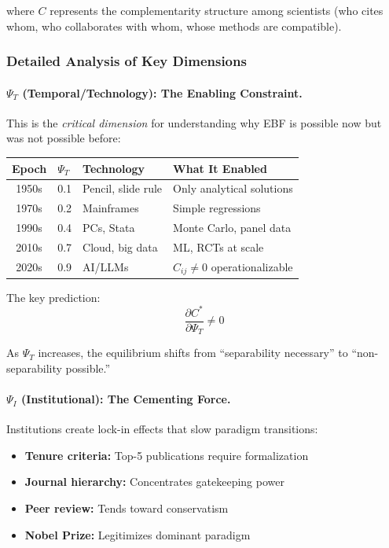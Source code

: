 where $C$ represents the complementarity structure among scientists (who cites whom,
who collaborates with whom, whose methods are compatible).

\subsubsection{Detailed Analysis of Key Dimensions}

\paragraph{$\Psi_T$ (Temporal/Technology): The Enabling Constraint.}

This is the \textit{critical dimension} for understanding why EBF is possible now
but was not possible before:

\begin{center}
\renewcommand{\arraystretch}{1.3}
\small
\begin{tabular}{@{}clll@{}}
\toprule
\textbf{Epoch} & $\Psi_T$ & \textbf{Technology} & \textbf{What It Enabled} \\
\midrule
1950s & 0.1 & Pencil, slide rule & Only analytical solutions \\
1970s & 0.2 & Mainframes & Simple regressions \\
1990s & 0.4 & PCs, Stata & Monte Carlo, panel data \\
2010s & 0.7 & Cloud, big data & ML, RCTs at scale \\
2020s & 0.9 & AI/LLMs & $C_{ij} \neq 0$ operationalizable \\
\bottomrule
\end{tabular}
\end{center}

The key prediction:
\begin{equation}
\frac{\partial C^*}{\partial \Psi_T} \neq 0
\end{equation}

As $\Psi_T$ increases, the equilibrium shifts from ``separability necessary''
to ``non-separability possible.''

\paragraph{$\Psi_I$ (Institutional): The Cementing Force.}

Institutions create lock-in effects that slow paradigm transitions:

\begin{itemize}[nosep]
    \item \textbf{Tenure criteria:} Top-5 publications require formalization
    \item \textbf{Journal hierarchy:} Concentrates gatekeeping power
    \item \textbf{Peer review:} Tends toward conservatism
    \item \textbf{Nobel Prize:} Legitimizes dominant paradigm
\end{itemize}

